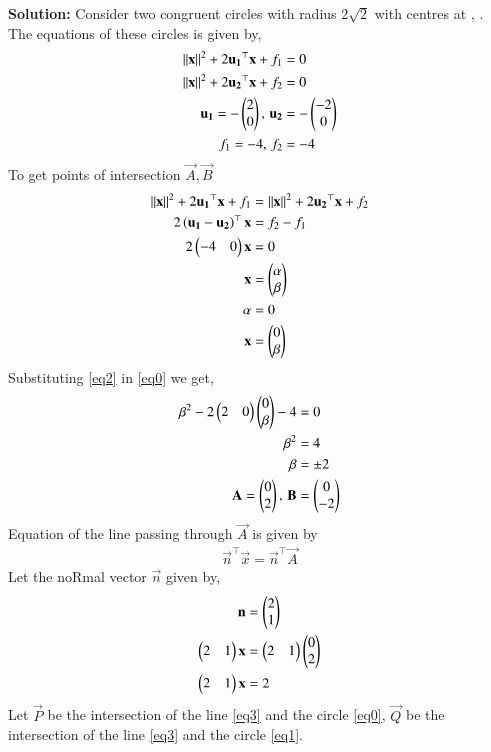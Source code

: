 \documentclass[journal,12pt,twocolumn]{IEEEtran}
\begin{document}
\begin{enumerate}
\textbf{Solution:}
Consider two congruent circles with radius $2\sqrt{2}$ with centres at , . The equations of these circles is given by,
\begin{align}
\left\lVert\mathbf{x}\right\rVert^2 + 2\mathbf{u_1}^\top\mathbf{x} + f_1 &= 0 
\label{eq0}\\
\left\lVert\mathbf{x}\right\rVert^2 + 2\mathbf{u_2}^\top\mathbf{x} + f_2 &= 0 
\label{eq1}\\
\mathbf{u_1} = -\begin{pmatrix}2\\0\end{pmatrix}, \, \mathbf{u_2} &= -\begin{pmatrix}-2\\0\end{pmatrix}\\
f_1 = -4, \, f_2 &= -4
\end{align}
To get points of intersection $\vec{A}, \vec{B}$
\begin{align}
\left\lVert\mathbf{x}\right\rVert^2 + 2\mathbf{u_1}^\top\mathbf{x} + f_1 &= \left\lVert\mathbf{x}\right\rVert^2 + 2\mathbf{u_2}^\top\mathbf{x} + f_2\\
2\left(\mathbf{u_1}-\mathbf{u_2}\right)^\top\mathbf{x} &= f_2 - f_1\\
2\begin{pmatrix}-4&0\end{pmatrix}\mathbf{x} &= 0\\
\mathbf{x} &= \begin{pmatrix}\alpha\\\beta\end{pmatrix}\\
\alpha &= 0\\
\mathbf{x} &= \begin{pmatrix}0 \\ \beta\end{pmatrix}
\label{eq2}
\end{align}
Substituting \eqref{eq2} in \eqref{eq0} we get,
\begin{align}
\beta^2 - 2\begin{pmatrix}2&0\end{pmatrix}\begin{pmatrix}0\\\beta\end{pmatrix}-4 &= 0\\
\beta^2 &= 4\\
\beta &= \pm 2\\
\mathbf{A} = \begin{pmatrix}0\\2\end{pmatrix}, \, \mathbf{B} &= \begin{pmatrix}0\\-2\end{pmatrix}
\end{align}
Equation of the line passing through $\vec{A}$ is given by
\begin{align}
\vec{n}^\top \vec{x} = \vec{n}^\top \vec{A}
\end{align}
Let the noRmal vector $\vec{n}$ given by,
\begin{align}
\mathbf{n} &= \begin{pmatrix}2\\1\end{pmatrix}\\
\begin{pmatrix}2&1\end{pmatrix}\mathbf{x} &= \begin{pmatrix}2&1\end{pmatrix}\begin{pmatrix}0\\2\end{pmatrix}\\
\begin{pmatrix}2&1\end{pmatrix}\mathbf{x} &= 2
\label{eq3}
\end{align}
Let $\vec{P}$ be the intersection of the line \eqref{eq3} and the circle \eqref{eq0}, $\vec{Q}$ be the intersection of the line \eqref{eq3} and the circle \eqref{eq1}. 

\end{enumerate}
\end{document}
